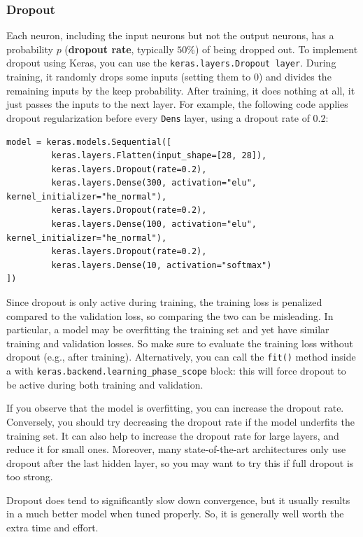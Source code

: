 \documentclass[12pt, letterpaper]{article}
\theoremstyle{definition}
\let\tb\textbf
\let\cd\lstinline
\begin{document}
\subsubsection{Dropout}
Each neuron, including the input neurons but not the output neurons, has a probability $p$ (\tb{dropout rate}, typically $50\%$) of being dropped out. To implement dropout using Keras, you can use the \cd+keras.layers.Dropout layer+. During training, it randomly drops some inputs (setting them to $0$) and divides the remaining inputs by the keep probability. After training, it does nothing at all, it just passes the inputs to the next layer. For example, the following code applies dropout regularization before every \cd+Dens+ layer, using a dropout rate of $0.2$:
\begin{lstlisting}
model = keras.models.Sequential([
         keras.layers.Flatten(input_shape=[28, 28]),
         keras.layers.Dropout(rate=0.2),
         keras.layers.Dense(300, activation="elu", kernel_initializer="he_normal"),
         keras.layers.Dropout(rate=0.2),
         keras.layers.Dense(100, activation="elu", kernel_initializer="he_normal"),
         keras.layers.Dropout(rate=0.2),
         keras.layers.Dense(10, activation="softmax")
])
\end{lstlisting}
Since dropout is only active during training, the training loss is penalized compared to the validation loss, so comparing the two can be misleading. In particular, a model may be overfitting the training set and yet have similar training and validation losses. So make sure to evaluate the training loss without dropout (e.g., after training). Alternatively, you can call the \cd+fit()+ method inside a with \cd+keras.backend.learning_phase_scope+ block: this will force dropout to be active during both training and validation.

If you observe that the model is overfitting, you can increase the dropout rate. Conversely, you should try decreasing the dropout rate if the model underfits the training set. It can also help to increase the dropout rate for large layers, and reduce it for small ones. Moreover, many state-of-the-art architectures only use dropout after the last hidden layer, so you may want to try this if full dropout is too strong.

Dropout does tend to significantly slow down convergence, but it usually results in a much better model when tuned properly. So, it is generally well worth the extra time and effort.
\end{document}
